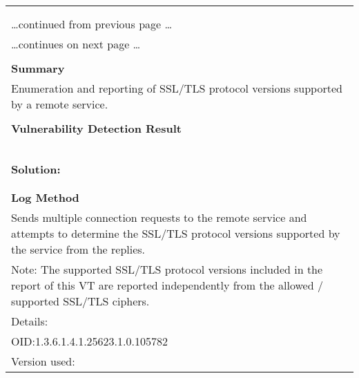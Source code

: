 \documentclass{article}
\begin{document}
\begin{longtable}{|p{}|}
\hline
\rowcolor{gvm_log}{\color{white}{Log (CVSS: 0.0) }}\\
\rowcolor{gvm_log}{\color{white}{NVT: SSL/TLS: Version Detection}}\\
\hline
\endfirsthead
\hfill\ldots continued from previous page \ldots \\
\hline
\endhead
\hline
\ldots continues on next page \ldots \\
\endfoot
\hline
\endlastfoot
\\
\textbf{Summary}\\
Enumeration and reporting of SSL/TLS protocol versions supported
  by a remote service.\\

        \hline
        \\
\textbf{Vulnerability Detection Result}\\
\rowcolor{white}{\verb=The remote SSL/TLS service supports the following SSL/TLS protocol version(s):=}\\
\rowcolor{white}{\verb=TLSv1.0=}\\
\rowcolor{white}{\verb=TLSv1.1=}\\
\rowcolor{white}{\verb=TLSv1.2=}\\

          \hline
          \\
\textbf{Solution:}\\
\\


        \hline
        \\
\textbf{Log Method}\\
Sends multiple connection requests to the remote service and
  attempts to determine the SSL/TLS protocol versions supported by the service from the replies.\\
  Note: The supported SSL/TLS protocol versions included in the report of this VT are reported
  independently from the allowed / supported SSL/TLS ciphers.\\
Details:
\rowcolor{white}{\verb=SSL/TLS: Version Detection=}\\
OID:1.3.6.1.4.1.25623.1.0.105782\\
Version used:
\rowcolor{white}{\verb=2021-12-06T15:42:24Z=}\\
\end{longtable}
\end{document}
